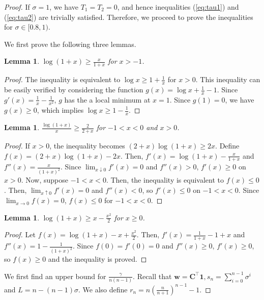 \documentclass{article}
\theoremstyle{plain}
\newtheorem{lemma}[theorem]{Lemma}
\theoremstyle{definition}
\theoremstyle{remark}
\def\bigopen#1{\left(#1\right)}
\def\vone{{\bm{1}}}
\def\vw{{\bm{w}}}
\def\mC{{\bm{C}}}
\begin{document}
\begin{proof}
If $\sigma=1$, we have $T_1=T_2=0$, and hence inequalities (\ref{eq:tau1}) and (\ref{eq:tau2}) are trivially satisfied. Therefore, we proceed to prove the inequalities for $\sigma \in [0.8, 1)$.

We first prove the following three lemmas.
\begin{lemma} \label{lem:logineq1}
$\log(1+x)\ge \frac{x}{1+x}$ for $x>-1$.
\end{lemma}
\begin{proof}
The inequality is equivalent to $\log x\ge 1+\frac{1}{x}$ for $x > 0$. This inequality can be easily verified by considering the function $g(x) = \log x + \frac{1}{x} - 1$. Since $g'(x)=\frac{1}{x} - \frac{1}{x^2}$, $g$ has the a local minimum at $x=1$. Since $g(1)=0$, we have $g(x)\ge 0$, which implies $\log x \ge 1-\frac{1}{x}$.
\end{proof}

\begin{lemma} \label{lem:logineq2}
$\frac{\log(1+x)}{x} \ge \frac{2}{2+x}$ for $-1<x<0$ and $x>0$.
\end{lemma}
\begin{proof}
If $x > 0$, the inequality becomes $(2+x)\log(1+x) \ge 2x$. Define $f(x) = (2+x)\log(1+x) - 2x$. Then, $f'(x) = \log(1+x) - \frac{x}{1+x}$ and $f''(x) = \frac{x}{(1+x)^2}$. Since $\lim_{ x \downarrow 0} f'(x) = 0$ and $f''(x) > 0$, $f'(x) \ge 0$ on $x>0$.
Now, suppose $-1<x<0$. Then, the inequality is equivalent to $f(x)\le 0$. Then, $\lim_{ x \uparrow 0} f'(x) = 0$ and $f''(x) < 0$, so $f'(x) \le 0$ on $-1<x<0$.
Since $\lim_{ x \to 0 } f(x)=0$, $f(x) \le 0$ for $-1<x<0$. 
\end{proof}

\begin{lemma} \label{lem:logineq3}
$\log (1+x) \ge x-\frac{x^2}{2}$ for $x\ge 0$.
\end{lemma}
\begin{proof}
Let $f(x)=\log(1+x)-x+\frac{x^2}{2}$. Then, $f'(x)=\frac{1}{1+x}-1+x$ and $f''(x)=1-\frac{1}{(1+x)^2}$. Since $f(0)=f'(0)=0$ and $f''(x)\ge 0$, $f'(x)\ge 0$, so $f(x)\ge 0$ and the inequality is proved.
\end{proof}

We first find an upper bound for $\frac{\gamma}{n(n-1)}$. Recall that $\vw = \mC^{\top} \vone, s_{n}=\sum_{i=0}^{n-1} \sigma^i$ and $L=n-(n-1)\sigma$. We also define $r_n = n\bigopen{ \frac{n}{n+1} }^{n-1}-1$.


\end{proof}
\end{document}

